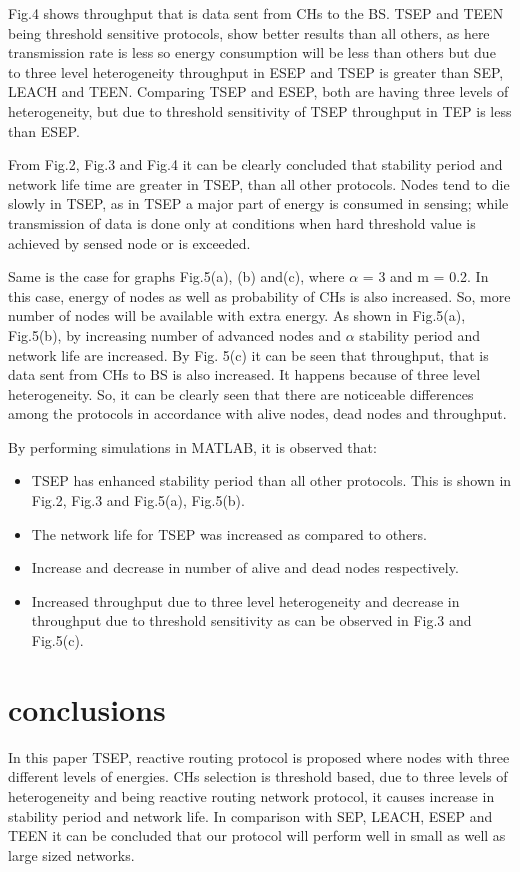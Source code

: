 \documentclass[conference]{IEEEtran}
\begin{document}
Fig.4 shows throughput that is data sent from CHs to the BS. TSEP and TEEN being threshold sensitive protocols, show better results than all others, as here transmission rate is less so energy consumption will be less than others but due to three level heterogeneity throughput in ESEP and TSEP is greater than SEP, LEACH and TEEN. Comparing TSEP and ESEP, both are having three levels of heterogeneity, but due to threshold sensitivity of TSEP throughput in TEP is less than ESEP.

From Fig.2, Fig.3 and Fig.4 it can be clearly concluded that stability period and network life time are greater in TSEP, than all other protocols. Nodes tend to die slowly in TSEP, as in TSEP a major part of energy is consumed in sensing; while transmission of data is done only at conditions when hard threshold value is achieved by sensed node or is exceeded.

Same is the case for graphs Fig.5(a), (b) and(c), where $\alpha$ = 3 and m = 0.2. In this case, energy of nodes as well as probability of CHs is also increased. So, more number of nodes will be available with extra energy. As shown in Fig.5(a), Fig.5(b), by increasing number of advanced nodes and $\alpha$ stability period and network life are increased.
By Fig. 5(c) it can be seen that throughput, that is data sent from CHs to BS is also increased. It happens because of three level heterogeneity. So, it can be clearly seen that there are noticeable differences among the protocols in accordance with alive nodes, dead nodes and throughput.

By performing simulations in MATLAB, it is observed that:\\
\begin{itemize}
  \item TSEP has enhanced stability period than all other protocols. This is shown in Fig.2, Fig.3 and Fig.5(a), Fig.5(b).
  \item	The network life for TSEP was increased as compared to others.
  \item Increase and decrease in number of alive and dead nodes respectively.
  \item Increased throughput due to three level heterogeneity and decrease in throughput due to threshold sensitivity as can be observed in Fig.3 and Fig.5(c).\\
\end{itemize}
	
\section{conclusions}
In this paper TSEP, reactive routing protocol is proposed where nodes with three different levels of energies. CHs selection is threshold based, due to three levels of heterogeneity and being reactive routing network protocol, it causes increase in stability period and network life. In comparison with SEP, LEACH, ESEP and TEEN it can be concluded that our protocol will perform well in small as well as large sized networks.
\end{document}
